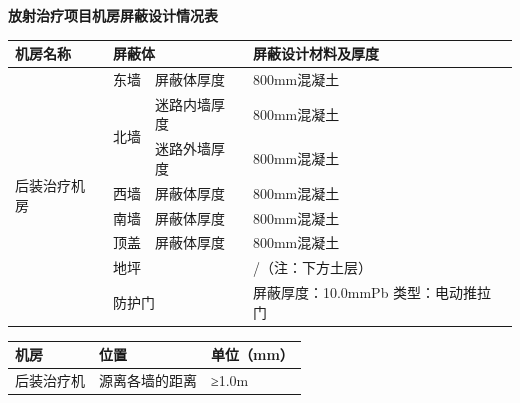 \vspace{10mm}
\begin{center}
\songti
\setlength{\tabrestwidth}{\dimexpr\textwidth - 2.0cm - 6\tabcolsep - 5\arrayrulewidth\relax}
\textbf{放射治疗项目机房屏蔽设计情况表}\par\vspace{2mm}
\begin{tabular}{|p{2.0cm}|p{\dimexpr\tabrestwidth/3\relax}|p{\dimexpr\tabrestwidth/3\relax}|p{\dimexpr\tabrestwidth/3\relax}|}
\hline
\raggedright 机房名称 & \multicolumn{2}{|p{\dimexpr \dimexpr\tabrestwidth/3\relax + \dimexpr\tabrestwidth/3\relax + 2\tabcolsep + 1\arrayrulewidth\relax}|}{\raggedright 屏蔽体} & \raggedright 屏蔽设计材料及厚度 \\
\hline
\multirow{8}{*}{\raggedright 后装治疗机房} & \raggedright 东墙 & \raggedright 屏蔽体厚度 & \raggedright 800mm混凝土 \\
 & \multirow{2}{*}{\raggedright 北墙} & \raggedright 迷路内墙厚度 & \raggedright 800mm混凝土 \\
 &  & \raggedright 迷路外墙厚度 & \raggedright 800mm混凝土 \\
 & \raggedright 西墙 & \raggedright 屏蔽体厚度 & \raggedright 800mm混凝土 \\
 & \raggedright 南墙 & \raggedright 屏蔽体厚度 & \raggedright 800mm混凝土 \\
 & \raggedright 顶盖 & \raggedright 屏蔽体厚度 & \raggedright 800mm混凝土 \\
 & \multicolumn{2}{|p{\dimexpr \dimexpr\tabrestwidth/3\relax + \dimexpr\tabrestwidth/3\relax + 2\tabcolsep + 1\arrayrulewidth\relax}|}{\raggedright 地坪} & \raggedright /（注：下方土层） \\
 & \multicolumn{2}{|p{\dimexpr \dimexpr\tabrestwidth/3\relax + \dimexpr\tabrestwidth/3\relax + 2\tabcolsep + 1\arrayrulewidth\relax}|}{\raggedright 防护门} & \raggedright 屏蔽厚度：10.0mmPb 类型：电动推拉门 \\
\hline
\end{tabular}
\end{center}


\vspace{10mm}
\begin{center}
\songti
\setlength{\tabrestwidth}{\dimexpr\textwidth - 2.0cm - 4\tabcolsep - 4\arrayrulewidth\relax}
\begin{tabular}{|p{2.0cm}|p{\dimexpr\tabrestwidth/2\relax}|p{\dimexpr\tabrestwidth/2\relax}|}
\hline
\raggedright 机房 & \raggedright 位置 & \raggedright 单位（mm） \\
\hline
\raggedright 后装治疗机 & \raggedright 源离各墙的距离 & \raggedright ≥1.0m \\
\hline
\end{tabular}
\end{center}



